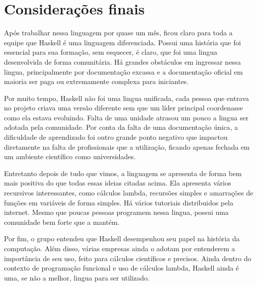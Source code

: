 \chapter*[Considerações finais]{Considerações finais}

    Após trabalhar nessa linguagem por quase um mês, ficou claro para toda a equipe que Haskell é uma linguagem diferenciada. Possui
    uma história que foi essencial para sua formação, sem esquecer, é claro, que foi uma lingua desenvolvida de forma comunitária.
    Há grandes obstáculos em ingressar nessa lingua, principalmente por documentação excassa e a documentação oficial em maioria ser
    paga ou extremamente complexa para iniciantes. 
    
    Por muito tempo, Haskell não foi uma lingua unificada, cada pessoa que entrava no projeto criava uma versão diferente sem que um líder
    principal coordenasse como ela estava evoluindo. Falta de uma unidade atrasou um pouco a lingua ser adotada pela comunidade.
    Por conta da falta de uma documentação única, a dificuldade de aprendizado foi outro grande ponto negativo que impactou diretamente
    na falta de profissionais que a utilização, ficando apenas fechada em um ambiente científico como universidades.

    Entretanto depois de tudo que vimos, a linguagem se apresenta de forma bem mais positiva do que todas essas ideias
    citadas acima. Ela apresenta vários recursivos interessantes, como cálculos lambda, recursões simples e amarrações de funções
    em variáveis de forma simples. Há vários tutoriais distribuidos pela internet. Mesmo que
    poucas pessoas programem nessa lingua, possui uma comunidade bem forte que a mantém.

    Por fim, o grupo entendeu que Haskell desempenhou seu papel na história da computação. Além disso,
    várias empresas ainda o adotam por entenderem a importância de seu uso, feito para cálculos científicos e precisos.
    Ainda dentro do contexto de programação funcional e uso de cálculos lambda, Haskell ainda é uma, se não a melhor,
    lingua para ser utilizado.

    \newpage
